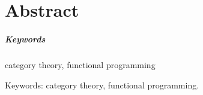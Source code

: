 \chapter{Abstract}


\paragraph{Keywords} category theory, functional programming

Keywords: category theory, functional programming.



\clearemptydoublepage
